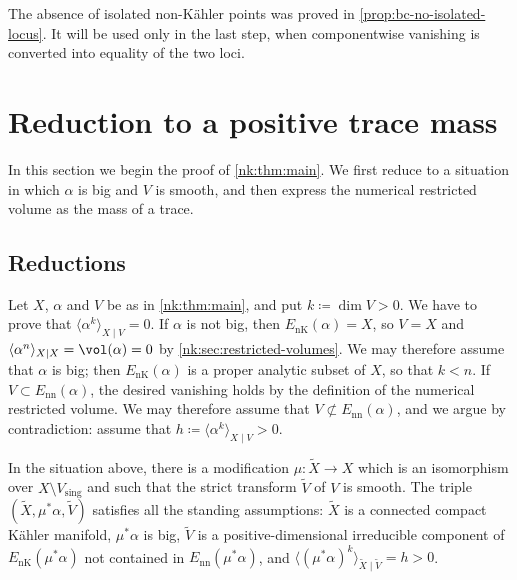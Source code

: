 The absence of isolated non-K\"ahler points was proved in
\cref{prop:bc-no-isolated-locus}. It will be used only in the last step,
when componentwise vanishing is converted into equality of the two loci.

\section{Reduction to a positive trace mass}\label{nk:sec:setup}

In this section we begin the proof of \cref{nk:thm:main}. We first reduce to
a situation in which $\alpha$ is big and $V$ is smooth, and then
express the numerical restricted volume as the mass of a trace.

\subsection{Reductions}

Let $X$, $\alpha$ and $V$ be as in \cref{nk:thm:main}, and put
$k\coloneqq \dim V>0$. We have to prove that
$\langle\alpha^k\rangle_{X\mid V}=0$.
If $\alpha$ is not big, then
${E_{\mathrm{nK}}}(\alpha)=X$, so $V=X$ and
$\langle\alpha^n\rangle_{X\mid X}=\vol(\alpha)=0$ by
\cref{nk:sec:restricted-volumes}. We may therefore assume that $\alpha$ is
big; then ${E_{\mathrm{nK}}}(\alpha)$ is a proper analytic subset of $X$, so that
$k<n$. If $V\subset{E_{\mathrm{nn}}}(\alpha)$, the desired vanishing holds by the
definition of the numerical restricted volume. We may therefore assume
that $V\not\subset{E_{\mathrm{nn}}}(\alpha)$, and we argue by contradiction: assume
that
$h\coloneqq \langle\alpha^k\rangle_{X\mid V}>0$.

\begin{lemma}\label{nk:lem:resolution}
In the situation above, there is a modification
$\mu\colon\widetilde X\to X$ which is an isomorphism over
$X\setminus V_{\mathrm{sing}}$ and such that the strict transform
$\widetilde V$ of $V$ is smooth. The triple
$(\widetilde X,\mu^*\alpha,\widetilde V)$ satisfies all the standing
assumptions: $\widetilde X$ is a connected compact K\"ahler manifold,
$\mu^*\alpha$ is big, $\widetilde V$ is a positive-dimensional
irreducible component of ${E_{\mathrm{nK}}}(\mu^*\alpha)$ not contained in
${E_{\mathrm{nn}}}(\mu^*\alpha)$, and
$\langle(\mu^*\alpha)^k\rangle_{\widetilde X\mid\widetilde V}=h>0$.
\end{lemma}

